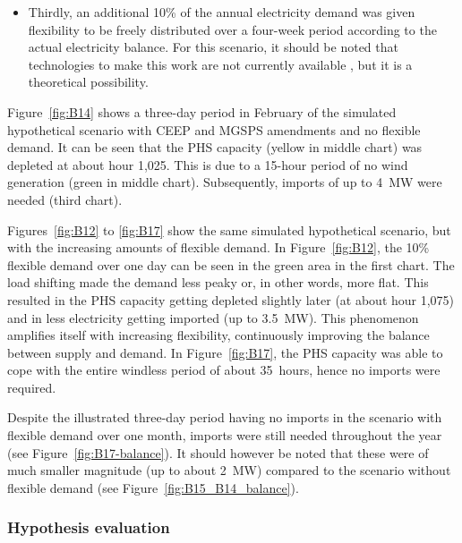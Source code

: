 \begin{itemize}
	\item Thirdly, an additional 10\% of the annual electricity demand was given flexibility to be freely distributed over a four-week period according to the actual electricity balance.
	For this scenario, it should be noted that technologies to make this work are not currently available \citep{Lund2017}, but it is a theoretical possibility.
\end{itemize}

Figure~\ref{fig:B14} shows a three-day period in February of the simulated hypothetical scenario with CEEP and MGSPS amendments and no flexible demand.
It can be seen that the PHS capacity (yellow in  middle chart) was depleted at about hour 1,025.
This is due to a 15-hour period of no wind generation (green in middle chart).
Subsequently, imports of up to 4~MW were needed (third chart).

Figures~\ref{fig:B12} to \ref{fig:B17} show the same simulated hypothetical scenario, but with the increasing amounts of flexible demand.
In Figure~\ref{fig:B12}, the 10\% flexible demand over one day can be seen in the green area in the first chart.
The load shifting made the demand less peaky or, in other words, more flat.
This resulted in the PHS capacity getting depleted slightly later (at about hour 1,075) and in less electricity getting imported (up to 3.5~MW).
This phenomenon amplifies itself with increasing flexibility, continuously improving the balance between supply and demand.
In Figure~\ref{fig:B17}, the PHS capacity was able to cope with the entire windless period of about 35~hours, hence no imports were required.



Despite the illustrated three-day period having no imports in the scenario with flexible demand over one month, imports were still needed throughout the year (see Figure~\ref{fig:B17-balance}).
It should however be noted that these were of much smaller magnitude (up to about 2~MW) compared to the scenario without flexible demand (see Figure~\ref{fig:B15_B14_balance}).



\subsubsection{Hypothesis evaluation}



